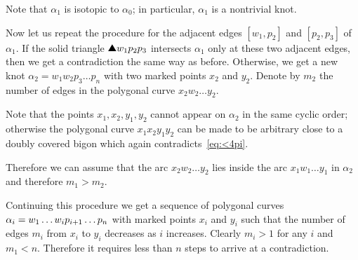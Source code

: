 Note that $\alpha_1$ is isotopic to $\alpha_0$;
in particular, $\alpha_1$ is a nontrivial knot.

Now let us repeat the procedure for the adjacent edges $[w_1,p_2]$ and $[p_2,p_3]$ of $\alpha_1$.
If the solid triangle $\solidtriangle w_1p_2p_3$ intersects $\alpha_1$ only at these two adjacent edges, then we get a contradiction the same way as before.
Otherwise, we get a new knot $\alpha_2=w_1w_2p_3\dots p_n$ with two marked points $x_2$ and $y_2$.
Denote by $m_2$ the number of edges in the polygonal curve $x_2w_2\dots y_2$.

Note that the points $x_1,x_2,y_1,y_2$ cannot appear on $\alpha_2$ in the same cyclic order;
otherwise the polygonal curve $x_1x_2y_1y_2$ can be made to be arbitrary close to a doubly covered bigon which again contradicts~\ref{eq:<4pi}.

Therefore we can assume that the arc $x_2w_2\dots y_2$ lies inside the arc $x_1w_1\dots y_1$ in $\alpha_2$
and therefore $m_1>m_2$.

Continuing this procedure we get a sequence of polygonal curves $\alpha_i\z=w_1\dots w_i p_{i+1}\dots p_n$ with marked points $x_i$ and $y_i$ such that the number of edges $m_i$ from $x_i$ to $y_i$ decreases as $i$ increases.
Clearly $m_i>1$ for any $i$ and $m_1<n$.
Therefore it requires less than $n$ steps to arrive at a contradiction.
\qeds

